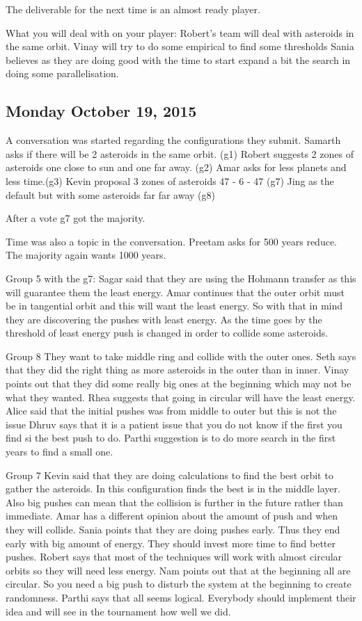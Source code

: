 The deliverable for the next time is an almost ready player.

What you will deal with on your player:
Robert’s team will deal with asteroids in the same orbit.
Vinay will try to do some empirical to find some thresholds
Sania believes as they are doing good with the time to start expand a bit the search in doing some parallelisation. 
\subsection{Monday October 19, 2015}
A conversation was started regarding the configurations they submit.
Samarth asks if there will be 2 asteroids in the same orbit. (g1)
Robert suggests 2 zones of asteroids one close to sun and one far away. (g2)
Amar asks for less planets and less time.(g3)
Kevin proposal 3 zones of asteroids 47 - 6 - 47 (g7)
Jing as the default but with some asteroids far far away (g8)

After a vote g7 got the majority.

Time was also a topic in the conversation.
Preetam asks for 500 years reduce.
The majority again wants 1000 years.


Group 5 with the g7:
Sagar said that they are using the Hohmann transfer as this will guarantee them the least energy.
Amar continues that the outer orbit must be in tangential orbit and this will want the least energy.
So with that in mind they are discovering the pushes with least energy. As the time goes by the threshold of least energy push is changed in order to collide some asteroids.

Group 8
They want to take middle ring and collide with the outer ones.
Seth says that they did the right thing as more asteroids in the outer than in inner.
Vinay points out that they did some really big ones at the beginning which may not be what they wanted.
Rhea suggests that going in circular will have the least energy.
Alice said that the initial pushes was from middle to outer but this is not the issue
Dhruv says that it is a patient issue that you do not know if the first you find si the best push to do.
Parthi suggestion is to do more search in the first years to find a small one.

Group 7 
Kevin said that they are doing calculations to find the best orbit to gather the asteroids. In this configuration finds the best is in the middle layer. Also big pushes can mean that the collision is further in the future rather than immediate.
Amar has a different opinion about the amount of push and when they will collide.
Sania points that they are doing pushes early. Thus they end early with big amount of energy. They should invest more time to find better pushes.
Robert says that most of the techniques will  work with almost circular orbits so they will need less energy.
Nam points out that at the beginning all are circular. So you need a big push to disturb the system at the beginning to create randomness.
Parthi says that all seems logical. Everybody should implement their idea and will see in the tournament how well we did.


